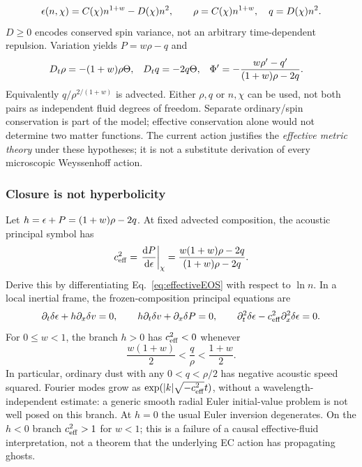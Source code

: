 \begin{equation}\label{eq:effectiveEOS}
 \epsilon(n,\chi)=C(\chi)n^{1+w}-D(\chi)n^2,
 \qquad \rho=C(\chi)n^{1+w},\quad q=D(\chi)n^2.
\end{equation}
$D\geq0$ encodes conserved spin variance, not an arbitrary time-dependent repulsion. Variation yields $P=w\rho-q$ and
\begin{align}
 D_t\rho&=-(1+w)\rho\Theta,&D_t q&=-2q\Theta,&
 \Phi'&=-\frac{w\rho'-q'}{(1+w)\rho-2q}.\label{eq:avgtransport}
\end{align}
Equivalently $q/\rho^{2/(1+w)}$ is advected. Either $\rho,q$ or $n,\chi$ can be used, not both pairs as independent fluid degrees of freedom. Separate ordinary/spin conservation is part of the model; effective conservation alone would not determine two matter functions. The current action justifies the \emph{effective metric theory} under these hypotheses; it is not a substitute derivation of every microscopic Weyssenhoff action.

\subsubsection{Closure is not hyperbolicity}
Let $h=\epsilon+P=(1+w)\rho-2q$. At fixed advected composition, the acoustic principal symbol has
\begin{equation}\label{eq:sound}
 c_{\rm eff}^2=\left.\frac{\mathrm d P}{\mathrm d\epsilon}\right|_\chi
 =\frac{w(1+w)\rho-2q}{(1+w)\rho-2q}.
\end{equation}
Derive this by differentiating Eq.~\eqref{eq:effectiveEOS} with respect to $\ln n$. In a local inertial frame, the frozen-composition principal equations are
\begin{equation}
 \partial_t\delta\epsilon+h\partial_x\delta v=0,
 \qquad h\partial_t\delta v+\partial_x\delta P=0,
 \qquad \partial_t^2\delta\epsilon-c_{\rm eff}^2\partial_x^2\delta\epsilon=0.
\end{equation}
For $0\leq w<1$, the branch $h>0$ has $c_{\rm eff}^2<0$ whenever
\begin{equation}
 \frac{w(1+w)}2<\frac q\rho<\frac{1+w}2.
\end{equation}
In particular, ordinary dust with any $0<q<\rho/2$ has negative acoustic speed squared. Fourier modes grow as $\exp(|k|\sqrt{-c_{\rm eff}^2}t)$, without a wavelength-independent estimate: a generic smooth radial Euler initial-value problem is not well posed on this branch. At $h=0$ the usual Euler inversion degenerates. On the $h<0$ branch $c_{\rm eff}^2>1$ for $w<1$; this is a failure of a causal effective-fluid interpretation, not a theorem that the underlying EC action has propagating ghosts.

